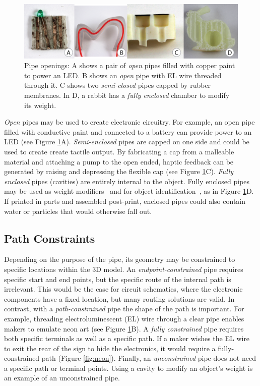 \begin{figure}[t]
\centering
    \includegraphics[width=1.0\columnwidth]{figures/types.png}
\caption{Pipe openings: A shows a pair of \emph{open} pipes filled with copper paint to power an LED.  B shows an \emph{open} pipe with EL wire threaded through it.  C shows two \emph{semi-closed} pipes capped by rubber membranes.  In D, a rabbit has a \emph{fully enclosed} chamber to modify its weight.}
\label{fig:openings}
\end{figure}

\emph{Open} pipes may be used to create electronic circuitry.  For example, an open pipe filled with conductive paint and connected to a battery can provide power to an LED (see Figure \ref{fig:openings}A).
%
\emph{Semi-enclosed} pipes are capped on one side and could be used to create create tactile output. By fabricating a cap from a malleable material and attaching a pump to the open ended, haptic feedback can be generated by raising and depressing the flexible cap (see Figure \ref{fig:openings}C).
%
\emph{Fully enclosed} pipes (cavities) are entirely internal to the object.  Fully enclosed pipes may be used as weight modifiers~\cite{Prevost-makeitstand} and for object identification~\cite{Willis-infrastructs}, as in Figure \ref{fig:openings}D.  If printed in parts and assembled post-print, enclosed pipes could also contain water or particles that would otherwise fall out.

\subsection{Path Constraints}
Depending on the purpose of the pipe, its geometry may be constrained to specific locations within the 3D model. An \emph{endpoint-constrained} pipe requires specific start and end points, but the specific route of the internal path is irrelevant. This would be the case for circuit schematics, where the electronic components have a fixed location, but many routing solutions are valid. In contrast, with a \emph{path-constrained} pipe the shape of the path is important. For example, threading electroluminescent (EL) wire through a clear pipe enables makers to emulate neon art (see Figure \ref{fig:openings}B). A \emph{fully constrained} pipe requires both specific terminals as well as a specific path. If a maker wishes the EL wire to exit the rear of the sign to hide the electronics, it would require a fully-constrained path (Figure \ref{fig:neon}). Finally, an \emph{unconstrained} pipe does not need a specific path or terminal points. Using a cavity to modify an object's weight is an example of an unconstrained pipe.

